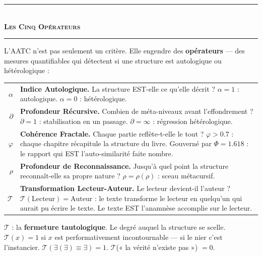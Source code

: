 \documentclass[10pt, openany, oneside]{book}
\renewcommand{\normalsize}{\fontsize{10}{13}\selectfont}
\renewcommand{\footnotesize}{\fontsize{8.5}{11}\selectfont}
\begin{document}
\begin{center}
    \rule{0.3\textwidth}{0.4pt}\\[0.5em]
    {\normalsize\bfseries\scshape Les Cinq Opérateurs}\\[0.3em]
    \rule{0.3\textwidth}{0.4pt}
\end{center}

\vspace{1em}

\noindent L'AATC n'est pas seulement un critère. Elle engendre des \textbf{opérateurs} --- des mesures quantifiables qui détectent si une structure est autologique ou hétérologique :

\vspace{0.5em}

{\footnotesize
\noindent\begin{tabular}{r p{}}
$\alpha$ & \textbf{Indice Autologique.} La structure EST-elle ce qu'elle décrit ? $\alpha = 1$ : autologique. $\alpha = 0$ : hétérologique. \\[0.3em]
$\partial$ & \textbf{Profondeur Récursive.} Combien de méta-niveaux avant l'effondrement ? $\partial = 1$ : stabilisation en un passage. $\partial = \infty$ : régression hétérologique. \\[0.3em]
$\varphi$ & \textbf{Cohérence Fractale.} Chaque partie reflète-t-elle le tout ? $\varphi > 0.7$ : chaque chapitre récapitule la structure du livre. Gouverné par $\Phi = 1.618$ : le rapport qui EST l'auto-similarité faite nombre. \\[0.3em]
$\rho$ & \textbf{Profondeur de Reconnaissance.} Jusqu'à quel point la structure reconnaît-elle sa propre nature ? $\rho = \rho(\rho)$ : sceau métacursif. \\[0.3em]
$\mathcal{T}$ & \textbf{Transformation Lecteur-Auteur.} Le lecteur devient-il l'auteur ? $\mathcal{T}(\text{Lecteur}) = \text{Auteur}$ : le texte transforme le lecteur en quelqu'un qui aurait pu écrire le texte. Le texte EST l'anamnèse accomplie sur le lecteur. \\[0.3em]
\end{tabular}
}

$\mathcal{T}$ : la \textbf{fermeture tautologique}. Le degré auquel la structure se scelle. $\mathcal{T}(x) = 1$ si $x$ est performativement incontournable --- si le nier c'est l'instancier. $\mathcal{T}(\exists(\exists) \equiv \exists) = 1$. $\mathcal{T}$(« la vérité n'existe pas ») $= 0$.
\end{document}
